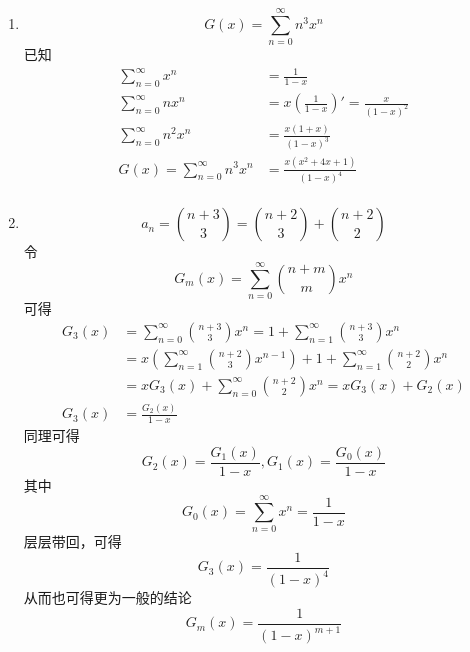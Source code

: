 \documentclass[a4paper]{article}
\begin{document}
\courseheader
\name{*** }

\begin{enumerate}[]
  \setlength{\itemsep}{3\parskip}
  
\item
\begin{solution}
    \begin{equation*}
        G(x) = \sum_{n=0} ^ {\infty} n^3 x^n 
    \end{equation*}
    已知
    \begin{align*}
        \sum_{n=0} ^ {\infty} x^n &= \frac{1}{1-x} \\
        \sum_{n=0} ^ {\infty} nx^n &= x (\frac{1}{1-x})' = \frac{x}{(1-x)^2} \\
        \sum_{n=0} ^ {\infty} n^2 x^n &= \frac{x(1+x)}{(1-x)^3} \\
        G(x)=\sum_{n=0} ^ {\infty} n^3 x^n &= \frac{x(x^2+4x+1)}{(1-x)^4} \\
    \end{align*}
\end{solution}


\item
\begin{solution}
\begin{equation*}
    a_n = \binom{n+3}{3} = \binom{n+2}{3} + \binom{n+2}{2}
\end{equation*}
令
\begin{equation*}
    G_m(x) = \sum_{n=0}^{\infty} \binom{n+m}{m} x^n
\end{equation*}
可得
\begin{align*}
    G_3(x)&=\sum_{n=0}^{\infty} \binom{n+3}{3} x^n  =1+\sum_{n=1}^{\infty} \binom{n+3}{3} x^n\\
          &=x (\sum_{n=1}^{\infty} \binom{n+2}{3} x^{n-1})  + 1+ \sum_{n=1}^{\infty} \binom{n+2}{2} x^n \\
          &=x G_3(x) + \sum_{n=0}^{\infty} \binom{n+2}{2} x^n = xG_3(x)+G_2(x) \\
    G_3(x)&=\frac{G_2(x)}{1-x}
\end{align*}
同理可得
\begin{equation*}
    G_2(x) = \frac{G_1(x)}{1-x} , G_1(x) = \frac{G_0(x)}{1-x}
\end{equation*}
其中 
\begin{equation*}
    G_0(x) = \sum_{n=0}^{\infty} x^n = \frac{1}{1-x}
\end{equation*}
层层带回，可得
\begin{equation*}
    G_3(x) = \frac{1}{(1-x)^4}
\end{equation*}
从而也可得更为一般的结论
\begin{equation*}
    G_m(x) = \frac{1}{(1-x)^{m+1}}
\end{equation*}


\end{solution}
\end{enumerate}
\end{document}
